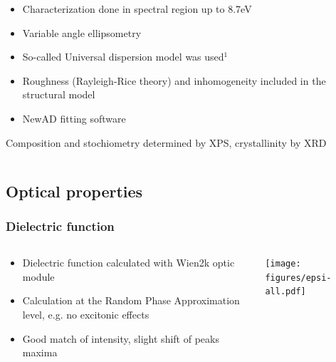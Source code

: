 \documentclass[noamsthm,8pt,t,xcolor={dvipsnames}]{beamer}
\begin{document}
\begin{frame}
\begin{columns}
\begin{column}{0.5\textwidth}
{\begin{itemize}
               \item Characterization done in spectral region up to 8.7eV
               \item Variable angle ellipsometry
               \item So-called Universal dispersion model was used$^1$
               \item Roughness (Rayleigh-Rice theory) and inhomogeneity included in the structural model
               \item NewAD fitting software
            \end{itemize}
            Composition and stochiometry determined by XPS, crystallinity by XRD
         }
         \end{column}
   \end{columns}
\end{frame}

\subsection{Optical properties}

\begin{frame}
   \frametitle{Dielectric function}

   \begin{columns}
      \begin{column}{0.3\textwidth}
         \begin{itemize}
            \item Dielectric function calculated with Wien2k optic module 
            \item Calculation at the Random Phase Approximation level, e.g. no excitonic effects
            \item Good match of intensity, slight shift of peaks maxima
         \end{itemize}
      \end{column}
      \begin{column}{0.7\textwidth}
         \begin{center}
            \texttt{[image: figures/epsi-all.pdf]}
         \end{center}
      \end{column}
   \end{columns}
\end{frame}
\end{document}
